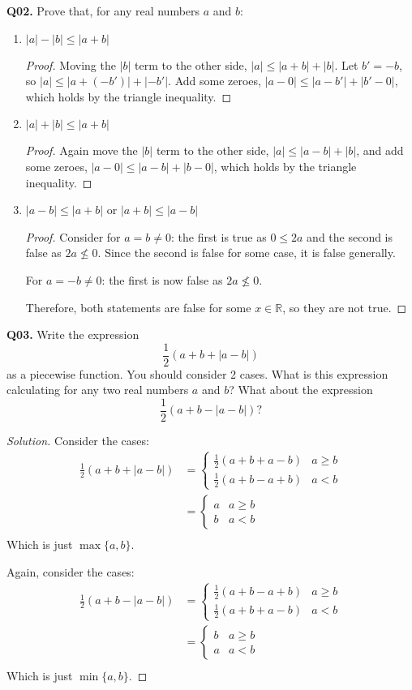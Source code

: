 \documentclass[11pt]{article}
\begin{document}
\textbf{Q02.} Prove that, for any real numbers $a$ and $b$:
\begin{enumerate}
  \item $|a|-|b| \leq |a+b|$
        \begin{proof}
          Moving the $|b|$ term to the other side, $|a|\leq|a+b|+|b|$.
          Let $b'=-b$, so $|a|\leq|a+(-b')|+|-b'|$.
          Add some zeroes, $|a-0|\leq|a-b'|+|b'-0|$, which holds by the triangle inequality.
        \end{proof}
  \item $|a|+|b| \leq |a+b|$
        \begin{proof}
          Again move the $|b|$ term to the other side, $|a|\leq|a-b|+|b|$, and add some zeroes, $|a-0|\leq|a-b|+|b-0|$, which holds by the triangle inequality.
        \end{proof}
  \item $|a-b| \leq |a+b|$ or $|a+b| \leq |a-b|$
        \begin{proof}
          Consider for $a=b\neq0$: the first is true as $0\leq2a$ and the second is false as $2a\not\leq0$. Since the second is false for some case, it is false generally.

          For $a=-b\neq0$: the first is now false as $2a\not\leq0$.

          Therefore, both statements are false for some $x\in\mathbb R$, so they are not true.
        \end{proof}
\end{enumerate}

\textbf{Q03.} Write the expression
\[ \frac{1}{2}(a+b+|a-b|) \]
as a piecewise function. You should consider 2 cases. What is this expression calculating for any two real numbers $a$ and $b$? What about the expression
\[ \frac{1}{2}(a+b-|a-b|)? \]
\begin{proof}[Solution]
  Consider the cases:
  \begin{align*}
    \frac12(a+b+|a-b|)
     & = \begin{cases}\frac12(a+b+a-b)&a\geq b \\ \frac12(a+b-a+b)&a<b\end{cases} \\
     & =\begin{cases} a&a\geq b \\ b&a<b \end{cases}  \\
  \end{align*}
  Which is just $\max \{a,b\}$.

  Again, consider the cases:
  \begin{align*}
    \frac12(a+b-|a-b|)
     & =\begin{cases}\frac12(a+b-a+b)&a\geq b \\ \frac12(a+b+a-b)&a<b\end{cases} \\
     & =\begin{cases} b&a\geq b \\ a&a<b \end{cases} \\
  \end{align*}
  Which is just $\min \{a,b\}$.
\end{proof}
\end{document}
